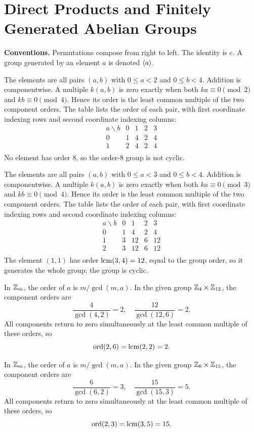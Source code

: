 \section{Direct Products and Finitely Generated Abelian Groups}
\textbf{Conventions.} Permutations compose from right to left. The identity is $e$. A group generated by an element $a$ is denoted $\langle a\rangle$.

The elements are all pairs $(a,b)$ with $0\le a<2$ and $0\le b<4$. Addition is componentwise. A multiple $k(a,b)$ is zero exactly when both $ka\equiv0\pmod{2}$ and $kb\equiv0\pmod{4}$. Hence its order is the least common multiple of the two component orders. The table lists the order of each pair, with first coordinate indexing rows and second coordinate indexing columns:\[\begin{array}{c|cccc}a\backslash b&0&1&2&3\\\hline0 & 1 & 4 & 2 & 4\\
1 & 2 & 4 & 2 & 4\\\end{array}\]No element has order $8$, so the order-$8$ group is not cyclic.

The elements are all pairs $(a,b)$ with $0\le a<3$ and $0\le b<4$. Addition is componentwise. A multiple $k(a,b)$ is zero exactly when both $ka\equiv0\pmod{3}$ and $kb\equiv0\pmod{4}$. Hence its order is the least common multiple of the two component orders. The table lists the order of each pair, with first coordinate indexing rows and second coordinate indexing columns:\[\begin{array}{c|cccc}a\backslash b&0&1&2&3\\\hline0 & 1 & 4 & 2 & 4\\
1 & 3 & 12 & 6 & 12\\
2 & 3 & 12 & 6 & 12\\\end{array}\]The element $(1,1)$ has order $\operatorname{lcm}(3,4)=12$, equal to the group order, so it generates the whole group; the group is cyclic.

In $\mathbb{Z}_m$, the order of $a$ is $m/\gcd(m,a)$. In the given group $\mathbb{Z}_{4}\times\mathbb{Z}_{12}$, the component orders are\[\frac{4}{\gcd(4,2)}=2,\quad \frac{12}{\gcd(12,6)}=2.\]All components return to zero simultaneously at the least common multiple of these orders, so\[\operatorname{ord}(2,6)=\operatorname{lcm}(2,2)=2.\]

In $\mathbb{Z}_m$, the order of $a$ is $m/\gcd(m,a)$. In the given group $\mathbb{Z}_{6}\times\mathbb{Z}_{15}$, the component orders are\[\frac{6}{\gcd(6,2)}=3,\quad \frac{15}{\gcd(15,3)}=5.\]All components return to zero simultaneously at the least common multiple of these orders, so\[\operatorname{ord}(2,3)=\operatorname{lcm}(3,5)=15.\]

